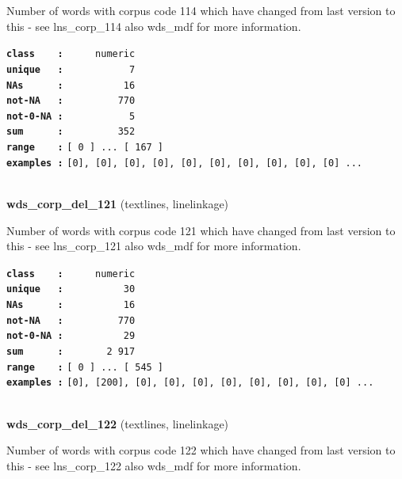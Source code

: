 \documentclass[]{article}
\begin{document}
Number of words with corpus code 114 which have changed from last
version to this - see lns\_corp\_114 also wds\_mdf for more information.

\textbf{\texttt{class\ \ \ \ :}} \texttt{~~~~~numeric}\\
\textbf{\texttt{unique\ \ \ :}} \texttt{~~~~~~~~~~~7}\\
\textbf{\texttt{NAs\ \ \ \ \ \ :}} \texttt{~~~~~~~~~~16}\\
\textbf{\texttt{not-NA\ \ \ :}} \texttt{~~~~~~~~~770}\\
\textbf{\texttt{not-0-NA\ :}} \texttt{~~~~~~~~~~~5}\\
\textbf{\texttt{sum\ \ \ \ \ \ :}} \texttt{~~~~~~~~~352}\\
\textbf{\texttt{range\ \ \ \ :}}
\texttt{{[}\ 0\ {]}\ ...\ {[}\ 167\ {]}}\\
\textbf{\texttt{examples\ :}}
\texttt{{[}0{]},\ {[}0{]},\ {[}0{]},\ {[}0{]},\ {[}0{]},\ {[}0{]},\ {[}0{]},\ {[}0{]},\ {[}0{]},\ {[}0{]}\ ...}\\

~

\textbf{wds\_corp\_del\_121} (textlines, linelinkage)

Number of words with corpus code 121 which have changed from last
version to this - see lns\_corp\_121 also wds\_mdf for more information.

\textbf{\texttt{class\ \ \ \ :}} \texttt{~~~~~numeric}\\
\textbf{\texttt{unique\ \ \ :}} \texttt{~~~~~~~~~~30}\\
\textbf{\texttt{NAs\ \ \ \ \ \ :}} \texttt{~~~~~~~~~~16}\\
\textbf{\texttt{not-NA\ \ \ :}} \texttt{~~~~~~~~~770}\\
\textbf{\texttt{not-0-NA\ :}} \texttt{~~~~~~~~~~29}\\
\textbf{\texttt{sum\ \ \ \ \ \ :}} \texttt{~~~~~~~2~917}\\
\textbf{\texttt{range\ \ \ \ :}}
\texttt{{[}\ 0\ {]}\ ...\ {[}\ 545\ {]}}\\
\textbf{\texttt{examples\ :}}
\texttt{{[}0{]},\ {[}200{]},\ {[}0{]},\ {[}0{]},\ {[}0{]},\ {[}0{]},\ {[}0{]},\ {[}0{]},\ {[}0{]},\ {[}0{]}\ ...}\\

~

\textbf{wds\_corp\_del\_122} (textlines, linelinkage)

Number of words with corpus code 122 which have changed from last
version to this - see lns\_corp\_122 also wds\_mdf for more information.
\end{document}
